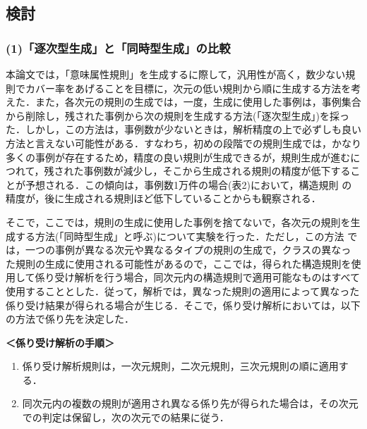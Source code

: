 \subsection{検討}
\subsubsection*{(1)「逐次型生成」と「同時型生成」の比較}

本論文では，「意味属性規則」を生成するに際して，汎用性が高く，数少ない規
則でカバー率をあげることを目標に，次元の低い規則から順に生成する方法を考
えた．また，各次元の規則の生成では，一度，生成に使用した事例は，事例集合
から削除し，残された事例から次の規則を生成する方法(「逐次型生成」)を採っ
た．しかし，この方法は，事例数が少ないときは，解析精度の上で必ずしも良い
方法と言えない可能性がある．すなわち，初めの段階での規則生成では，かなり
多くの事例が存在するため，精度の良い規則が生成できるが，規則生成が進むに
つれて，残された事例数が減少し，そこから生成される規則の精度が低下するこ
とが予想される．この傾向は，事例数1万件の場合(表2)において，構造規則
の精度が，後に生成される規則ほど低下していることからも観察される．

そこで，ここでは，規則の生成に使用した事例を捨てないで，各次元の規則を生
成する方法(「同時型生成」と呼ぶ)について実験を行った．ただし，この方法
では，一つの事例が異なる次元や異なるタイプの規則の生成で，クラスの異なっ
た規則の生成に使用される可能性があるので，ここでは，得られた構造規則を使
用して係り受け解析を行う場合，同次元内の構造規則で適用可能なものはすべて
使用することとした．従って，解析では，異なった規則の適用によって異なった
係り受け結果が得られる場合が生じる．そこで，係り受け解析においては，以下
の方法で係り先を決定した．
\vspace{\baselineskip}

\noindent
{\bf＜係り受け解析の手順＞}
\begin{enumerate}
\item 係り受け解析規則は，一次元規則，二次元規則，三次元規則の順に適用する．

\item  同次元内の複数の規則が適用され異なる係り先が得られた場合は，その次元
   での判定は保留し，次の次元での結果に従う．
\end{enumerate}\vspace{\baselineskip}

